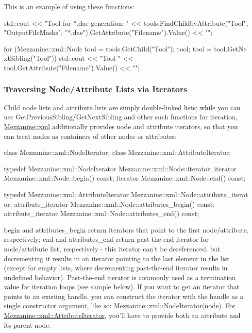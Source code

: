 This is an example of using these functions: 
\begin{DoxyCode}
 std::cout << "Tool for *.dae generation: " << tools.FindChildbyAttribute("Tool",
       "OutputFileMasks", "*.dae").GetAttribute("Filename").Value() << "\n";

 for (Mezzanine::xml::Node tool = tools.GetChild("Tool"); tool; tool = tool.GetNe
      xtSibling("Tool"))
 {
     std::cout << "Tool " << tool.GetAttribute("Filename").Value() << "\n";
 }
\end{DoxyCode}
 \hypertarget{XMLManual_XMLAccessingIterators}{}\subsubsection{Traversing Node/Attribute Lists via Iterators}\label{XMLManual_XMLAccessingIterators}
Child node lists and attribute lists are simply double-\/linked lists; while you can use GetPreviousSibling/GetNextSibling and other such functions for iteration, \hyperlink{namespaceMezzanine_1_1xml}{Mezzanine::xml} additionally provides node and attribute iterators, so that you can treat nodes as containers of other nodes or attributes: 
\begin{DoxyCode}
 class Mezzanine::xml::NodeIterator;
 class Mezzanine::xml::AttributeIterator;

 typedef Mezzanine::xml::NodeIterator Mezzanine::xml::Node::iterator;
 iterator Mezzanine::xml::Node::begin() const;
 iterator Mezzanine::xml::Node::end() const;

 typedef Mezzanine::xml::AttributeIterator Mezzanine::xml::Node::attribute_iterat
      or;
 attribute_iterator Mezzanine::xml::Node::attributes_begin() const;
 attribute_iterator Mezzanine::xml::Node::attributes_end() const;
\end{DoxyCode}
 begin and attributes\_\-begin return iterators that point to the first node/attribute, respectively; end and attributes\_\-end return past-\/the-\/end iterator for node/attribute list, respectively -\/ this iterator can't be dereferenced, but decrementing it results in an iterator pointing to the last element in the list (except for empty lists, where decrementing past-\/the-\/end iterator results in undefined behavior). Past-\/the-\/end iterator is commonly used as a termination value for iteration loops (see sample below). If you want to get an iterator that points to an existing handle, you can construct the iterator with the handle as a single constructor argument, like so: Mezzanine::xml::NodeIterator(node). For \hyperlink{classMezzanine_1_1xml_1_1AttributeIterator}{Mezzanine::xml::AttributeIterator}, you'll have to provide both an attribute and its parent node. \par
